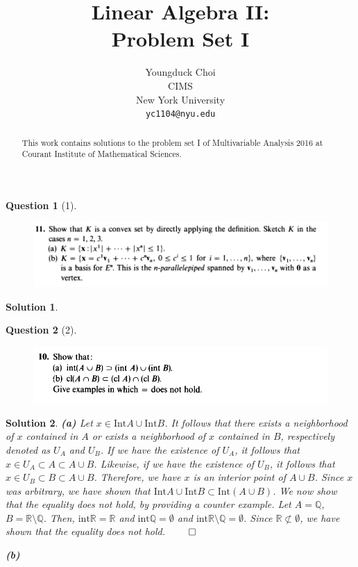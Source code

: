 \documentclass{article} %
\title{Linear Algebra II: \\
Problem Set I}
\author{
Youngduck Choi \\
CIMS \\
New York University\\
\texttt{yc1104@nyu.edu} \\
}
\theoremstyle{quest}
\newtheorem*{question}{Question}
\newtheorem*{solution}{Solution}
\begin{document}
\maketitle

\begin{abstract}
This work contains solutions to the problem set I
of Multivariable Analysis 2016 at Courant Institute of Mathematical Sciences.
\end{abstract}

\bigskip

\begin{question}[1]
\hfill
\begin{figure}[h!]
  \centering
    \includegraphics[width=1\textwidth]{MV-1-3-11.png}
\end{figure}
\end{question}
\begin{solution}
\end{solution}

\bigskip

\begin{question}[2]
\hfill
\begin{figure}[h!]
  \centering
    \includegraphics[width=1\textwidth]{MV-1-4-10.png}
\end{figure}
\end{question}
\begin{solution}
\textbf{(a)}
Let $x \in \text{Int} A \cup \text{Int} B$. It follows that there exists a neighborhood of 
$x$ contained in $A$ or exists a neighborhood of $x$ contained in $B$, respectively denoted 
as $U_A$ and $U_B$. If we have the existence of $U_A$, it follows that 
$x \in U_A \subset A \subset A \cup B$. Likewise, if we have the existence of $U_B$, it follows
that $x \in U_B \subset B \subset A \cup B$. Therefore, we have $x$ is an interior point of $A
\cup B$.
Since $x$ was arbitrary, we have shown that $\text{Int} A \cup \text{Int} B 
\subset \text{Int}(A \cup B)$. We now show that the equality does not hold, by providing
a counter example. Let $A = \mathbb{Q}$, $B = \mathbb{R\setminus Q}$. Then, 
$\text{int}\mathbb{R} = \mathbb{R}$ and $\text{int}\mathbb{Q} = \emptyset$ and 
$\text{int}\mathbb{R\setminus Q} = \emptyset$. Since $\mathbb{R} \not\subset
\emptyset$, we have shown that the equality does not hold. \hfill $\qed$  

\bigskip

\textbf{(b)}

 
\end{solution}
\end{document}
